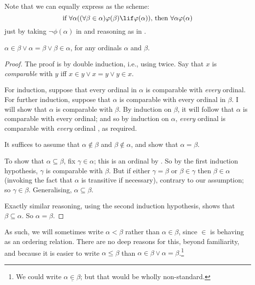 \documentclass[../../../include/open-logic-section]{subfiles}
\begin{document}
Note that we can equally express  as the
scheme:
\[
\text{if }\forall \alpha((\forall \beta \in \alpha)\phi(\beta) \lif 
\phi(\alpha))\text{, then }\forall \alpha\phi(\alpha)
\]
just by taking $\lnot\phi(\alpha)$ in  and reasoning as in .

\begin{thm}[Trichotomy] 
$\alpha \in \beta \lor \alpha = \beta \lor \beta \in \alpha$, for any
ordinals $\alpha$ and $\beta$. 
\end{thm}

\begin{proof}
The proof is by double induction, i.e., using
 twice. Say that $x$ is \emph{comparable}
with $y$ iff $x \in y \lor x = y \lor y \in x$. 

For induction, suppose that every ordinal in $\alpha$ is comparable
with \emph{every} ordinal. For further induction, suppose that
$\alpha$ is comparable with every ordinal in $\beta$. I will show that
$\alpha$ is comparable with $\beta$. By induction on $\beta$, it will
follow that $\alpha$ is comparable with every ordinal; and so by
induction on $\alpha$, \emph{every} ordinal is comparable with
\emph{every} ordinal , as required. 

It suffices to assume that $\alpha \notin \beta$ and $\beta \notin
\alpha$, and show that $\alpha = \beta$. 

To show that $\alpha \subseteq \beta$, fix $\gamma \in \alpha$; this
is an ordinal by . So by the first induction
hypothesis, $\gamma$ is comparable with $\beta$. But if either $\gamma
= \beta$ or $\beta \in \gamma$ then $\beta \in \alpha$ (invoking the
fact that $\alpha$ is transitive if necessary), contrary to our
assumption; so $\gamma \in \beta$. Generalising, $\alpha \subseteq
\beta$.

Exactly similar reasoning, using the second induction hypothesis,
shows that $\beta \subseteq \alpha$. So $\alpha = \beta$.
\end{proof}\noindent As such, we will sometimes write $\alpha <\beta$
rather than $\alpha \in \beta$, since $\in$ is behaving as an ordering
relation. There are no deep reasons for this, beyond familiarity, and
because it is easier to write $\alpha \leq \beta$ than $\alpha \in
\beta \lor \alpha = \beta$.\footnote{We could write $\alpha
\mathrel{\underline{\in}} \beta$; but that would be wholly
non-standard.}
\end{document}
